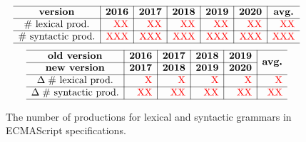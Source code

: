 \begin{figure}[t]
  \[
    \begin{array}{c|r|r|r|r|r|r}
      \hline
      \textbf{version}
      & \multicolumn{1}{c|}{\textbf{2016}}
      & \multicolumn{1}{c|}{\textbf{2017}}
      & \multicolumn{1}{c|}{\textbf{2018}}
      & \multicolumn{1}{c|}{\textbf{2019}}
      & \multicolumn{1}{c|}{\textbf{2020}}
      & \multicolumn{1}{c}{\textbf{avg.}}\\\hline
      \text{\# lexical prod.}
      & \text{\inred{XX}}
      & \text{\inred{XX}}
      & \text{\inred{XX}}
      & \text{\inred{XX}}
      & \text{\inred{XX}}
      & \text{\inred{XX}}\\\hline
      \text{\# syntactic prod.}
      & \text{\inred{XXX}}
      & \text{\inred{XXX}}
      & \text{\inred{XXX}}
      & \text{\inred{XXX}}
      & \text{\inred{XXX}}
      & \text{\inred{XXX}}\\\hline
    \end{array}
  \]
  \[
    \begin{array}{c|r|r|r|r|r}
      \hline
      \textbf{old version}
      & \multicolumn{1}{c|}{\textbf{2016}}
      & \multicolumn{1}{c|}{\textbf{2017}}
      & \multicolumn{1}{c|}{\textbf{2018}}
      & \multicolumn{1}{c|}{\textbf{2019}}
      & \multirow{2}{*}{\textbf{avg.}}\\\cline{1-5}
      \textbf{new version}
      & \multicolumn{1}{c|}{\textbf{2017}}
      & \multicolumn{1}{c|}{\textbf{2018}}
      & \multicolumn{1}{c|}{\textbf{2019}}
      & \multicolumn{1}{c|}{\textbf{2020}}
      & \\\hline
      \Delta \; \text{\# lexical prod.}
      & \text{\inred{X}}
      & \text{\inred{X}}
      & \text{\inred{X}}
      & \text{\inred{X}}
      & \text{\inred{X}}\\\hline
      \Delta \; \text{\# syntactic prod.}
      & \text{\inred{XX}}
      & \text{\inred{XX}}
      & \text{\inred{XX}}
      & \text{\inred{XX}}
      & \text{\inred{XX}}\\\hline
    \end{array}
  \]
  \caption{The number of productions for lexical and
  syntactic grammars in ECMAScript specifications.}
  \label{fig:syntax-all-version}
\end{figure}

